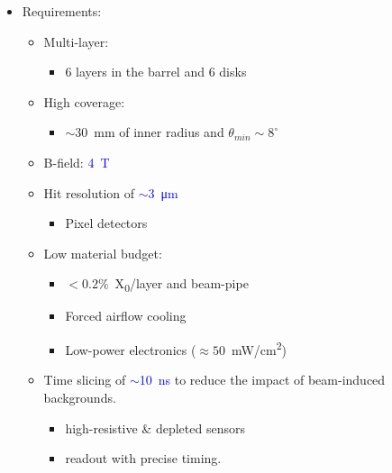 \begin{frame}
\begin{columns}
    \begin{itemize}
    \item Requirements:
      \begin{itemize}
      \item Multi-layer: 
        \begin{itemize}
          \item 6 layers in the barrel and 6 disks
          \end{itemize}
      \item High coverage: 
        \begin{itemize}
        \item $\sim30$~mm of inner radius and
          $\theta_{min}\sim8^{\circ}$
        \end{itemize}
      \item B-field: \textcolor{Blue}{4~T}
      \item Hit resolution of
        \textcolor{Blue}{$\sim$\SI{3}{\micro\meter}}
        \begin{itemize}
        \item Pixel detectors
        \end{itemize}
      \item Low material budget: 
        \begin{itemize}
        \item $<0.2\%$~X\textsubscript{0}/layer and beam-pipe
        \item Forced airflow cooling
        \item Low-power electronics
          ($\approx 50$~mW/cm\textsuperscript{2})
        \end{itemize}
      \item Time slicing of \textcolor{Blue}{$\sim$\SI{10}{\nano\second}}
        to reduce the impact of beam-induced backgrounds.
        \begin{itemize}
        \item high-resistive \& depleted sensors
        \item readout with precise timing.
        \end{itemize}
      \end{itemize}
    \end{itemize}

    \centering


\end{columns}
\end{frame}
